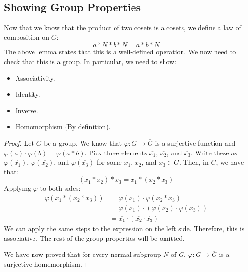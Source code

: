 \documentclass[letterpaper]{article}
\begin{document}
\subsection{Showing Group Properties}
Now that we know that the product of two cosets is a cosets, we define a law of composition on $\overline{G}$: 
\[a * N * b * N = a * b * N\]
The above lemma states that this is a well-defined operation. We now need to check that this is a group. In particular, we need to show: 
\begin{itemize}
    \item Associativity.
    \item Identity. 
    \item Inverse. 
    \item Homomorphism (By definition).
\end{itemize}
\begin{mdframed}
    \begin{proof}
        Let $G$ be a group. We know that $\varphi: G \to \overline{G}$ is a surjective function and $\varphi(a) \cdot \varphi(b) = \varphi(a * b)$. Pick three elements $\overline{x_1}$, $\overline{x_2}$, and $\overline{x_3}$. Write these as $\varphi(\overline{x_1})$, $\varphi(\overline{x_2})$, and $\varphi(\overline{x_3})$ for some $x_1$, $x_2$, and $x_3 \in G$. Then, in $G$, we have that: 
        \[(x_1 * x_2) * x_3 = x_1 * (x_2 * x_3)\]
        Applying $\varphi$ to both sides: 
        \begin{equation*}
            \begin{aligned}
                \varphi(x_1 * (x_2 * x_3)) &= \varphi(x_1) \cdot \varphi(x_2 * x_3) \\ 
                    &= \varphi(x_1) \cdot (\varphi(x_2) \cdot \varphi(x_3)) \\ 
                    &= \overline{x_1} \cdot (\overline{x_2} \cdot \overline{x_3})
            \end{aligned}
        \end{equation*}
        We can apply the same steps to the expression on the left side. Therefore, this is associative. The rest of the group properties will be omitted. 

        \bigskip 

        We have now proved that for every normal subgroup $N$ of $G$, $\varphi: G \to \overline{G}$ is a surjective homomorphism. 
    \end{proof}
\end{mdframed}
\end{document}
